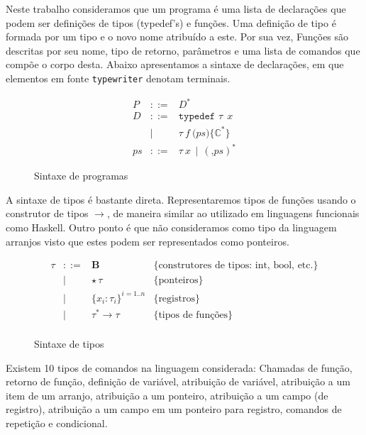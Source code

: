 \documentclass[a4paper,8pt]{article}
\begin{document}
     Neste trabalho consideramos que um programa é uma lista de
     declarações que podem ser definições de tipos (typedef's) e
     funções. Uma definição de tipo é formada por um tipo e o novo 
     nome atribuído a este. Por sua vez, Funções são descritas por seu 
     nome, tipo de retorno, parâmetros e uma lista de comandos que 
     compõe o corpo desta. Abaixo apresentamos a sintaxe de
     declarações, em que elementos em fonte \texttt{typewriter}
     denotam terminais.
     
     \begin{figure}[h]
         \[
               \begin{array}{lcl}
                   P & ::=    & D^*\\
                   D & ::=   & \texttt{typedef }\tau\:\:x\\
                      & \mid & \tau\:f\:\texttt{(}ps\texttt{)} \texttt{\{}\mathbb{C}^*\texttt{\}} \\
                   ps & ::= & \tau\:x \,\mid\,(\texttt{,}ps)^*
               \end{array}
         \]
         \centering
         \caption{Sintaxe de programas}
         \label{figprogsyn}
     \end{figure}

     A sintaxe de tipos é bastante direta. Representaremos tipos de
     funções usando o construtor de tipos $\to$, de maneira similar ao
     utilizado em linguagens funcionais como Haskell. 
     Outro ponto é que não consideramos
     como tipo da linguagem arranjos visto que estes podem ser
     representados como ponteiros.

     \begin{figure}[h]
       \[
         \begin{array}{lcll}
           \tau & ::= & \textbf{B} & \{\text{construtores de tipos:
                                     int, bool, etc.}\}\\
                & \mid & \star\, \tau & \{\text{ponteiros}\} \\
                & \mid & \{x_i : \tau_i\}^{i=1..n} & \{\text{registros}\} \\
                & \mid & \tau^* \to \tau & \{\text{tipos de funções}\}\\
         \end{array}
       \]
       \centering
       \caption{Sintaxe de tipos}
       \label{figtypesyn}
     \end{figure}
     
     Existem 10 tipos de comandos na linguagem considerada: Chamadas de
     função, retorno de função, definição de variável, atribuição de
     variável, atribuição a um item de um arranjo, atribuição a um
     ponteiro, atribuição a um campo (de registro), atribuição a um
     campo em um ponteiro para registro, comandos de repetição e condicional.
\end{document}
